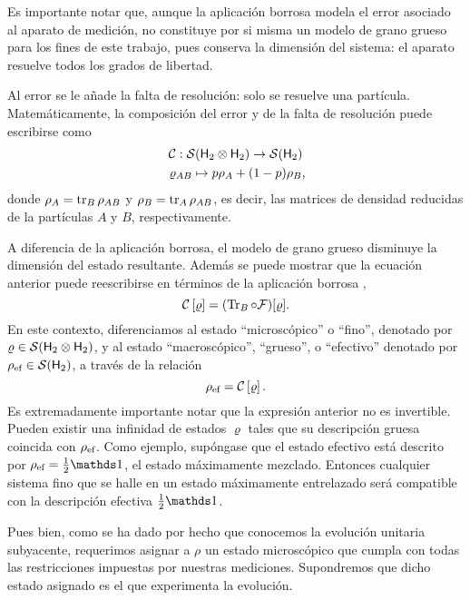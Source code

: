 Es importante notar que, aunque la aplicación borrosa modela el error asociado al aparato de medición, no constituye por si misma un modelo de grano grueso para los fines de este trabajo, pues conserva la dimensión del sistema: el aparato resuelve todos los grados de libertad.


Al error se le añade la falta de resolución: solo se resuelve una partícula. Matemáticamente, la composición del error y de la falta de resolución puede escribirse como
\begin{gather}
    \mcC:\mcS(\hilbert_2 \otimes \hilbert_2)\to \mcS(\hilbert_2)\nonumber\\
    \varrho_{AB} \mapsto p\rho_A+(1-p)\rho_B\rlap{,}\nonumber
\end{gather}
donde $\rho_A=\tr_B \rho_{AB}$ y $\rho_B=\tr_A \rho_{AB}$, es decir, las matrices de densidad reducidas de la partículas $A$ y $B$, respectivamente.


A diferencia de la aplicación borrosa, el modelo de grano grueso disminuye la dimensión del estado resultante. Además se puede mostrar que la ecuación anterior puede reescribirse en términos de la aplicación borrosa \cite{FuzzyMeasurements},
\begin{equation}
\mathcal{C}\left[\varrho\right]=(\Tr_{B}\circ\mathcal{F})[\varrho].\nonumber
\end{equation}
En este contexto, diferenciamos al estado ``microscópico'' o ``fino'', denotado por $\varrho\in \mathcal{S}({\sf H}_2\otimes{\sf H}_2)$, y al estado ``macroscópico'', ``grueso'', o  ``efectivo'' denotado por $\rho_{\text{ef}}\in \mathcal{S}({\sf H}_2)$, a través de la relación
\begin{equation}
    \rho_{\text{ef}}=\mathcal{C}\left[\varrho\right].\nonumber
\end{equation}
Es extremadamente importante notar que la expresión anterior no es invertible. Pueden existir una infinidad de estados $\varrho$ tales que su descripción gruesa coincida con $\rho_{\text{ef}}$. Como ejemplo, supóngase que el estado efectivo está descrito por $\rho_{\ef}=\frac{1}{2}\Id$, el estado máximamente mezclado. Entonces cualquier sistema fino que se halle en un estado máximamente entrelazado será compatible con la descripción efectiva $\frac{1}{2}\Id$.

Pues bien, como se ha dado por hecho que conocemos la evolución unitaria subyacente, requerimos asignar a $\rho$ un estado microscópico que cumpla con todas las restricciones impuestas por nuestras mediciones. Supondremos que dicho estado asignado es el que experimenta la evolución. 

